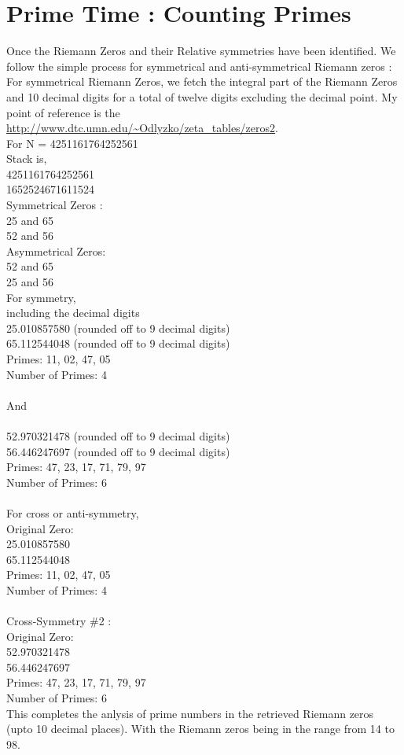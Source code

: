 \section{Prime Time : Counting Primes }

Once the Riemann Zeros and their Relative symmetries have been identified. We follow the simple process for symmetrical and anti-symmetrical Riemann zeros : 
For symmetrical Riemann Zeros, we fetch the integral part of the Riemann Zeros and 10 decimal digits for a total of twelve digits excluding the decimal point.
My point of reference is the \\
\url{http://www.dtc.umn.edu/~Odlyzko/zeta_tables/zeros2}{}.\\
For N = 4251161764252561 \\
Stack is, \\
4251161764252561\\
1652524671611524\\
Symmetrical Zeros : \\
25 and 65\\
52 and 56\\
Asymmetrical Zeros:\\
52 and 65\\
25 and 56\\
For symmetry,\\
including the decimal digits\\
25.010857580 (rounded off to 9 decimal digits) \\
65.112544048 (rounded off to 9 decimal digits) \\
Primes: 11, 02, 47, 05 \\
Number of Primes: 4\\
\\
And \\
\\
52.970321478 (rounded off to 9 decimal digits) \\
56.446247697 (rounded off to 9 decimal digits) \\
Primes: 47, 23, 17, 71, 79, 97 \\
Number of Primes: 6\\
\\
For cross or anti-symmetry,\\
Original Zero:\\
25.010857580\\
65.112544048\\
Primes: 11, 02, 47, 05\\
Number of Primes: 4\\
\\
Cross-Symmetry \#2 :\\
Original Zero:\\
52.970321478\\
56.446247697\\
Primes: 47, 23, 17, 71, 79, 97\\
Number of Primes: 6\\
This completes the anlysis of prime numbers in the retrieved Riemann zeros (upto 10 decimal places). With the Riemann zeros being in the range from 14 to 98.

